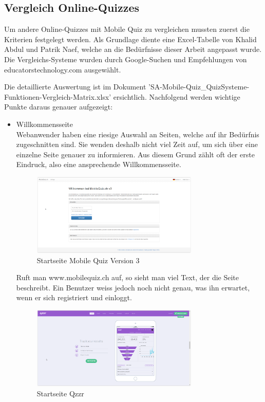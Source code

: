 	\subsection{Vergleich Online-Quizzes}
	Um andere Online-Quizzes mit Mobile Quiz zu vergleichen mussten zuerst die Kriterien festgelegt werden. Als Grundlage diente eine Excel-Tabelle von Khalid Abdul und Patrik Naef, welche an die Bedürfnisse dieser Arbeit angepasst wurde.
	Die Vergleichs-Systeme wurden durch Google-Suchen und Empfehlungen von educatorstechnology.com \cite{educatorstechnology.com} ausgewählt.
	
	Die detaillierte Auswertung ist im Dokument 'SA-Mobile-Quiz\_QuizSysteme-Funktionen-Vergleich-Matrix.xlsx' ersichtlich. Nachfolgend werden wichtige Punkte daraus genauer aufgezeigt:
	
	\begin{itemize}
		\item Willkommensseite \\
		Webanwender haben eine riesige Auswahl an Seiten, welche auf ihr Bedürfnis zugeschnitten sind. Sie wenden deshalb nicht viel Zeit auf, um sich über eine einzelne Seite genauer zu informieren. Aus diesem Grund zählt oft der erste Eindruck, also eine ansprechende Willkommensseite. \\
		
		\begin{figure}[H]
			\centering
			\includegraphics[width=0.75\textwidth]{Images/MobileQuiz_StartPage.PNG}
			\caption{Startseite Mobile Quiz Version 3}
		\end{figure}
		
		Ruft man www.mobilequiz.ch auf, so sieht man viel Text, der die Seite beschreibt. Ein Benutzer weiss jedoch noch nicht genau, was ihn erwartet, wenn er sich registriert und einloggt.
		
		\begin{figure}[H]
			\centering
			\includegraphics[width=0.75\textwidth]
			{Images/Qzzr_StartPage_Statistics.PNG}
			\caption{Startseite Qzzr}
		\end{figure}
				

\end{itemize}
